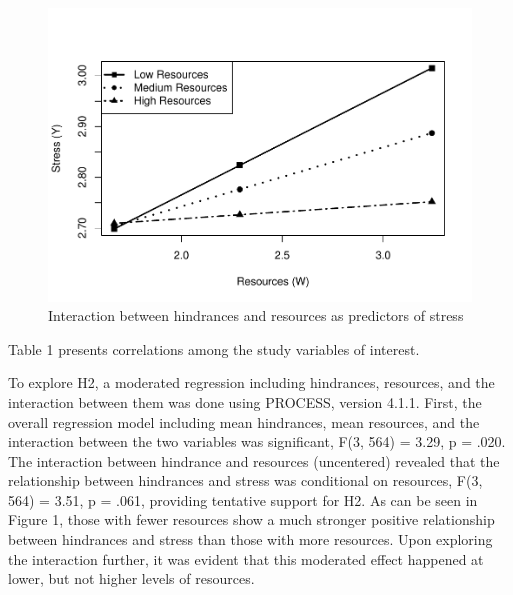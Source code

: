 \documentclass[
  english,
  man]{apa6}
\begin{document}
\begin{figure}
\centering
\includegraphics{SIOP_PROCESS_files/figure-latex/analyses-1.pdf}
\caption{\label{fig:analyses}Interaction between hindrances and resources as predictors of stress}
\end{figure}

Table 1 presents correlations among the study variables of interest.

To explore H2, a moderated regression including hindrances, resources, and the interaction between them was done using PROCESS, version 4.1.1. First, the overall regression model including mean hindrances, mean resources, and the interaction between the two variables was significant, F(3, 564) = 3.29, p = .020. The interaction between hindrance and resources (uncentered) revealed that the relationship between hindrances and stress was conditional on resources, F(3, 564) = 3.51, p = .061, providing tentative support for H2. As can be seen in Figure 1, those with fewer resources show a much stronger positive relationship between hindrances and stress than those with more resources. Upon exploring the interaction further, it was evident that this moderated effect happened at lower, but not higher levels of resources.
\end{document}
